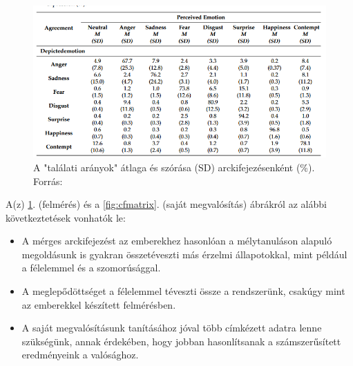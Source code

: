 \documentclass[12pt,a4]{article}
\begin{document}
        \begin{figure}[h]	
    		\centering
    		\includegraphics[width=1\linewidth]{facerechuman-confmatrix.png}
            \caption{A "találati arányok" átlaga és szórása (SD) arckifejezésenként (\%). Forrás: \cite{facerecresult}}
            \label{fig:humanfacerecmatrix}
    	\end{figure} 

        \clearpage

        A(z) \ref{fig:humanfacerecmatrix}. (felmérés) és a \ref{fig:cfmatrix}. (saját megvalósítás) ábrákról az alábbi következtetések vonhatók le:

        \begin{itemize}
            \item A mérges arckifejezést az emberekhez hasonlóan a mélytanuláson alapuló megoldásunk is gyakran összetéveszti más érzelmi állapotokkal, mint például a félelemmel és a szomorúsággal.
            \item A meglepődöttséget a félelemmel téveszti össze a rendszerünk, csakúgy mint az emberekkel készített felmérésben.
            \item A saját megvalósításunk tanításához jóval több címkézett adatra lenne szükségünk, annak érdekében, hogy jobban hasonlítsanak a számszerűsített eredményeink a valósághoz.
        \end{itemize}
\end{document}
